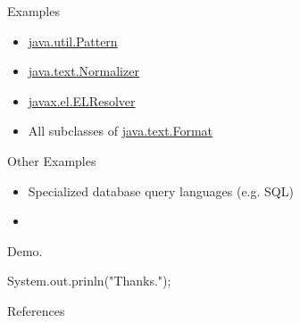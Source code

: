     \begin{frame}{Examples}
        \begin{itemize}
            \item \href{http://docs.oracle.com/javase/8/docs/api/java/util/regex/Pattern.html}{java.util.Pattern} 
            \item \href{http://docs.oracle.com/javase/8/docs/api/java/text/Normalizer.html}{java.text.Normalizer} 
            \item \href{http://docs.oracle.com/javaee/7/api/javax/el/ELResolver.html}{javax.el.ELResolver} 
            \item All subclasses of \href{http://docs.oracle.com/javase/8/docs/api/java/text/Format.html}{java.text.Format}
        \end{itemize}
    \end{frame}

    \begin{frame}{Other Examples}
        \begin{itemize}
            \item Specialized database query languages (e.g. SQL)
            \item 
        \end{itemize}
    \end{frame}

    \begin{frame}[focus]
        Demo.
    \end{frame}

    \begin{frame}[focus]
        System.out.prinln("Thanks.");
    \end{frame}

    \appendix
    \begin{frame}{References}
        \nocite{*}
        
        
    \end{frame}
    

